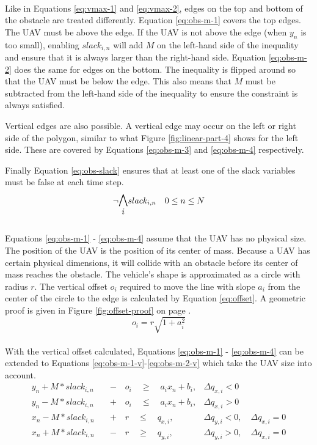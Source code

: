 \\
Like in Equations \ref{eq:vmax-1} and \ref{eq:vmax-2}, edges on the top and bottom of the obstacle are treated differently. Equation \ref{eq:obs-m-1} covers the top edges. The UAV must be above the edge. If the UAV is not above the edge (when $y_n$ is too small), enabling $slack_{i,n}$ will add $M$ on the left-hand side of the inequality and ensure that it is always larger than the right-hand side. Equation \ref{eq:obs-m-2} does the same for edges on the bottom. The inequality is flipped around so that the UAV must be below the edge. This also means that $M$ must be subtracted from the left-hand side of the inequality to ensure the constraint is always satisfied.
\par
Vertical edges are also possible. A vertical edge may occur on the left or right side of the polygon, similar to what Figure \ref{fig:linear-part-4} shows for the left side. These are covered by Equations \ref{eq:obs-m-3} and \ref{eq:obs-m-4} respectively.
\par
Finally Equation \ref{eq:obs-slack} ensures that at least one of the slack variables must be false at each time step.
\\
\begin{equation}
\neg \mathlarger{\mathlarger{\bigwedge_{i}}} slack_{i,n} \quad 0 \leq n \leq N
\label{eq:obs-slack}
\end{equation}
\\
Equations \ref{eq:obs-m-1} - \ref{eq:obs-m-4} assume that the UAV has no physical size. The position of the UAV is the position of its center of mass. Because a UAV has certain physical dimensions, it will collide with an obstacle before its center of mass reaches the obstacle. The vehicle's shape is approximated as a circle with radius $r$. The vertical offset $o_i$ required to move the line with slope $a_i$ from the center of the circle to the edge is calculated by Equation \ref{eq:offset}. A geometric proof is given in Figure \ref{fig:offset-proof} on page \pageref{fig:offset-proof}.
\\
\begin{equation}
o_{i} = r \sqrt{1 + a_i^2}
\label{eq:offset}
\end{equation}
\\
With the vertical offset calculated, Equations \ref{eq:obs-m-1} - \ref{eq:obs-m-4} can be extended to Equations \ref{eq:obs-m-1-v}-\ref{eq:obs-m-2-v} which take the UAV size into account.
\\
\begin{align}
y_{n} + M*slack_{i,n} \quad &- \quad o_i \quad \geq 
\quad a_{i} x_{n} + b_{i},  	
& \Delta q_{x,i} < 0 							 	
\label{eq:obs-m-1-v} \\
y_{n} - M*slack_{i,n} \quad &+ \quad o_i \quad \leq 
\quad a_{i} x_{n} + b_{i},
& \Delta q_{x,i} > 0 							 	
\label{eq:obs-m-2-v} \\
x_{n} - M*slack_{i,n} \quad &+ \quad r \quad \leq
\quad  q_{x,i}, 		
& \Delta q_{y,i} < 0, \quad \Delta q_{x,i} = 0 	
\label{eq:obs-m-3-v} \\
x_{n} + M*slack_{i,n} \quad &- \quad r \quad \geq 
\quad q_{y,i},  		
& \Delta q_{y,i} > 0, \quad \Delta q_{x,i} = 0 	
\label{eq:obs-m-4-v}
\end{align}

